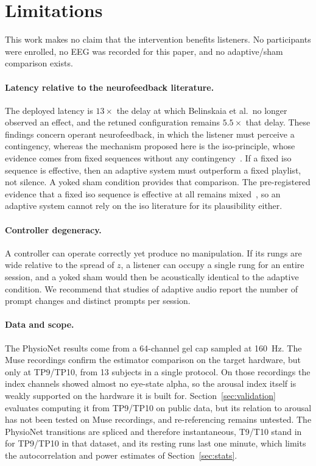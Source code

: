 \documentclass[11pt,a4paper]{article}
\begin{document}
\section{Limitations}
\label{sec:limitations}

This work makes no claim that the intervention benefits listeners. No participants were
enrolled, no EEG was recorded for this paper, and no adaptive/sham comparison exists.

\paragraph{Latency relative to the neurofeedback literature.} The deployed latency is
$13\times$ the delay at which Belinskaia et al.\ no longer observed an effect, and the
retuned configuration remains $5.5\times$ that delay. These findings concern operant
neurofeedback, in which the listener must perceive a contingency, whereas the mechanism
proposed here is the iso-principle, whose evidence comes from fixed sequences without any
contingency~\cite{starcke}. If a fixed iso sequence is effective, then an adaptive system
must outperform a fixed playlist, not silence. A yoked sham condition provides that
comparison. The pre-registered evidence that a fixed iso sequence is effective at all
remains mixed~\cite{lowebrown}, so an adaptive system cannot rely on the iso literature for
its plausibility either.

\paragraph{Controller degeneracy.} A controller can operate correctly yet produce no
manipulation. If its rungs are wide relative to the spread of $z$, a listener can occupy a
single rung for an entire session, and a yoked sham would then be acoustically identical to
the adaptive condition. We recommend that studies of adaptive audio report the number of
prompt changes and distinct prompts per session.

\paragraph{Data and scope.} The PhysioNet results come from a 64-channel gel cap sampled at
160~Hz. The Muse recordings confirm the estimator comparison on the target hardware, but
only at TP9/TP10, from 13 subjects in a single protocol. On those recordings the index
channels showed almost no eye-state alpha, so the arousal index itself is weakly supported
on the hardware it is built for. Section~\ref{sec:validation} evaluates computing it from
TP9/TP10 on public data, but its relation to arousal has not been tested on Muse
recordings, and re-referencing remains untested. The PhysioNet transitions are spliced
and therefore instantaneous, T9/T10 stand in for TP9/TP10 in that dataset, and its resting runs last one
minute, which limits the autocorrelation and power estimates of Section~\ref{sec:stats}.
\end{document}
